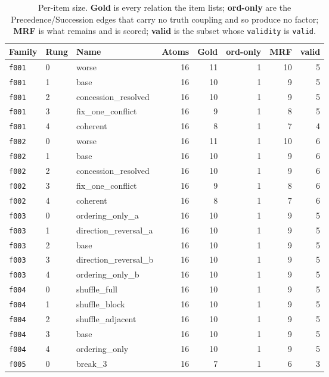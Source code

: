 \documentclass[11pt]{article}
\begin{document}
\begin{table}[htbp]
\centering
\small
\caption{Per-item size. \textbf{Gold} is every relation the item lists; \textbf{ord-only} are the Precedence/Succession edges that carry no truth coupling and so produce no factor; \textbf{MRF} is what remains and is scored; \textbf{valid} is the subset whose \texttt{validity} is \texttt{valid}.}
\label{tab:dataset}
\begin{tabular}{lllrrrrr}
\toprule
Family & Rung & Name & Atoms & Gold & ord-only & MRF & valid \\
\midrule
\texttt{f001} & 0 & worse & 16 & 11 & 1 & 10 & 5 \\
\texttt{f001} & 1 & base & 16 & 10 & 1 & 9 & 5 \\
\texttt{f001} & 2 & concession\_resolved & 16 & 10 & 1 & 9 & 5 \\
\texttt{f001} & 3 & fix\_one\_conflict & 16 & 9 & 1 & 8 & 5 \\
\texttt{f001} & 4 & coherent & 16 & 8 & 1 & 7 & 4 \\
\texttt{f002} & 0 & worse & 16 & 11 & 1 & 10 & 6 \\
\texttt{f002} & 1 & base & 16 & 10 & 1 & 9 & 6 \\
\texttt{f002} & 2 & concession\_resolved & 16 & 10 & 1 & 9 & 6 \\
\texttt{f002} & 3 & fix\_one\_conflict & 16 & 9 & 1 & 8 & 6 \\
\texttt{f002} & 4 & coherent & 16 & 8 & 1 & 7 & 6 \\
\texttt{f003} & 0 & ordering\_only\_a & 16 & 10 & 1 & 9 & 5 \\
\texttt{f003} & 1 & direction\_reversal\_a & 16 & 10 & 1 & 9 & 5 \\
\texttt{f003} & 2 & base & 16 & 10 & 1 & 9 & 5 \\
\texttt{f003} & 3 & direction\_reversal\_b & 16 & 10 & 1 & 9 & 5 \\
\texttt{f003} & 4 & ordering\_only\_b & 16 & 10 & 1 & 9 & 5 \\
\texttt{f004} & 0 & shuffle\_full & 16 & 10 & 1 & 9 & 5 \\
\texttt{f004} & 1 & shuffle\_block & 16 & 10 & 1 & 9 & 5 \\
\texttt{f004} & 2 & shuffle\_adjacent & 16 & 10 & 1 & 9 & 5 \\
\texttt{f004} & 3 & base & 16 & 10 & 1 & 9 & 5 \\
\texttt{f004} & 4 & ordering\_only & 16 & 10 & 1 & 9 & 5 \\
\texttt{f005} & 0 & break\_3 & 16 & 7 & 1 & 6 & 3 \\

\end{tabular}
\end{table}
\end{document}
